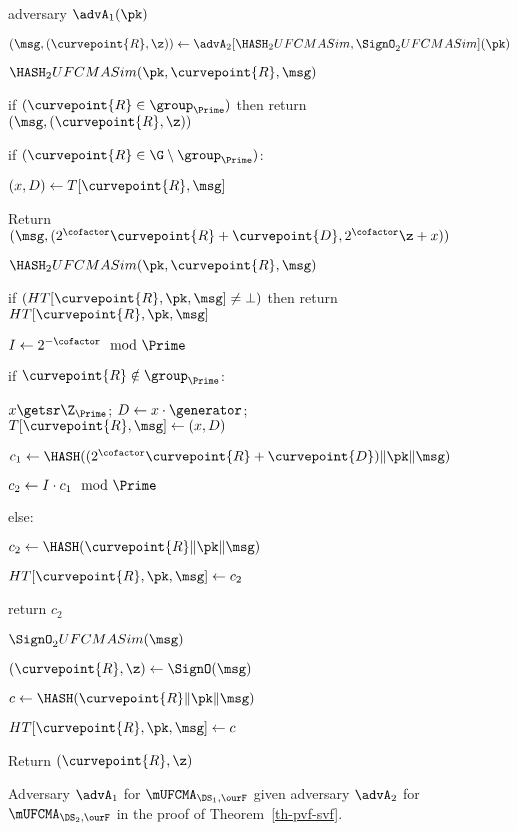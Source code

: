 \begin{figure}
	{	
		\begin{algorithm-initial}{adversary $\advA_1(\pk)$}
			\item $(\msg, (\curvepoint{R}, \z)) \gets \advA_2[\HASH_2UFCMASim, \SignO_2 UFCMASim](\pk)$
			\item $\HASH_2UFCMASim(\pk, \curvepoint{R},  \msg)$
			\item if $(\curvepoint{R} \in \group_{\Prime})$ then return $(\msg, (\curvepoint{R}, \z))$
			\item if $(\curvepoint{R} \in \G \setminus \group_{\Prime})$:
			\item \quad $(x, D) \gets T[\curvepoint{R}, \msg]$
			\item Return $( \msg, (2^\cofactor\curvepoint{R} + \curvepoint{D}, 2^\cofactor\z + x))$
		\end{algorithm-initial}  \vspace{2pt}
		\begin{algorithm-subsequent}{$\HASH_2UFCMASim(\pk, \curvepoint{R},  \msg)$}
			\item if $(HT[\curvepoint{R}, \pk, \msg] \neq \bot)$ then return $HT[\curvepoint{R}, \pk, \msg]$
			\item $I \gets 2^{-\cofactor} \mod \Prime$
			\item if $\curvepoint{R} \notin \group_{\Prime}$:
			\item \quad $x \getsr \Z_{\Prime}$; $D \gets x \cdot \generator$; $T[\curvepoint{R}, \msg] \gets (x, D)$
			\item \quad $c_1 \gets \HASH((2^\cofactor\curvepoint{R} + \curvepoint{D}) \|\pk\| \msg)$
			\item \quad $c_2 \gets I \cdot c_1 \mod \Prime$
			\item else:
			\item \quad $c_2 \gets \HASH(\curvepoint{R}\|\pk\| \msg)$
			\item $HT[\curvepoint{R}, \pk, \msg] \gets c_2$
			\item return $c_2$
		\end{algorithm-subsequent}  
		\begin{algorithm-subsequent}{$\SignO_2 UFCMASim(\msg)$}
			\item $(\curvepoint{R}, \z) \gets \SignO(\msg)$
			\item $c \gets \HASH(\curvepoint{R}\|\pk\| \msg)$
			\item $HT[\curvepoint{R}, \pk, \msg] \gets c$
			\item Return $(\curvepoint{R}, \z)$
		\end{algorithm-subsequent} 
	}
	\vspace{-5pt}
	\caption{Adversary $\advA_1$ for $\mUFCMA_{\DS_1,\ourF}$ given adversary $\advA_2$ for $\mUFCMA_{\DS_2,\ourF}$ in the proof of Theorem~\ref{th-pvf-svf}.}
	\label{fig:A1}
	\hrulefill
	\vspace{-10pt}
\end{figure}




